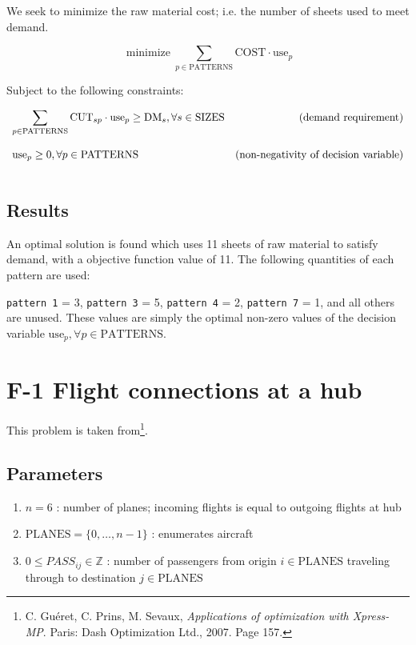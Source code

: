 \documentclass[8pt,oneside]{extarticle}
\newcommand{\Int}{\mathbb{Z}}
\DeclareMathOperator*{\minimize}{minimize}
\begin{document}
We seek to minimize the raw material cost; i.e. the number of sheets used to meet demand.

$$
\minimize \sum_{p\in\mathrm{PATTERNS}} \mathrm{COST}\cdot \mathrm{use}_p
$$

Subject to the following constraints:

$$
\begin{array}{lr}
    \displaystyle
    \sum_{p\in\mathrm{PATTERNS}} \mathrm{CUT}_{sp}\cdot \mathrm{use}_p
    \geq \mathrm{DM}_s, \forall s \in\mathrm{SIZES}
    & \text{(demand requirement)}
    \bigskip\\

    \displaystyle
    \mathrm{use}_p \geq 0, \forall p\in\mathrm{PATTERNS}
    & \text{(non-negativity of decision variable)}
    \bigskip\\
\end{array}
$$

\subsection{Results}

An optimal solution is found which uses 11 sheets of raw material to satisfy
demand, with a objective function value of 11. The following quantities of each pattern
are used:

\texttt{pattern 1} = 3,
\texttt{pattern 3} = 5,
\texttt{pattern 4} = 2,
\texttt{pattern 7} = 1,
and all others are unused. These values are simply the optimal non-zero values of the decision variable
$\mathrm{use}_p, \forall p\in\mathrm{PATTERNS}$.

\newpage

\section{F-1 Flight connections at a hub}

This problem is taken from\footnote{C. Guéret, C. Prins, M. Sevaux, \textit{Applications of optimization with Xpress-MP}. %
Paris: Dash Optimization Ltd., 2007. Page 157.}.

\subsection{Parameters}

\begin{enumerate}

    \item $n=6$ : number of planes; incoming flights is equal to outgoing flights at hub
    \item $\mathrm{PLANES} = \lbrace 0,\ldots,n-1\rbrace$ : enumerates aircraft
    \item $0 \leq PASS_{ij} \in\Int$ : number of passengers from origin $i\in\mathrm{PLANES}$ traveling through to
        destination $j\in\mathrm{PLANES}$

\end{enumerate}
\end{document}
